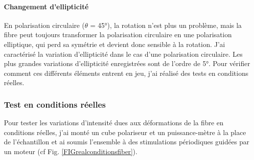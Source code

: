 
\paragraph{Changement d'ellipticité}

En polarisation circulaire ($\theta$ = 45°), la rotation n'est plus un problème, mais la fibre peut toujours transformer la polarisation circulaire en une polarisation elliptique, qui perd sa symétrie et devient donc sensible à la rotation. J'ai caractérisé la variation d'ellipticité dans le cas d'une polarisation circulaire. Les plus grandes variations d'ellipticité enregistrées sont de l'ordre de 5°. Pour vérifier comment ces différents éléments entrent en jeu, j'ai réalisé des tests en conditions réelles.

\subsubsection{Test en conditions réelles}


Pour tester les variations d'intensité dues aux déformations de la fibre en conditions réelles, j'ai monté un cube polariseur et un puissance-mètre à la place de l'échantillon et ai soumis l'ensemble à des stimulations périodiques guidées par un moteur (cf Fig. \ref{FIGrealconditionsfiber}).

